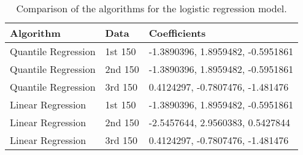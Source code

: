 \documentclass[article]{jss}\usepackage[]{graphicx}\usepackage[]{xcolor}
\begin{document}
\begin{table}[t!]
\centering
\begin{tabular}{llp{10cm}}
\hline
Algorithm           & Data    & Coefficients \\ \hline
Quantile Regression & 1st 150 & -1.3890396, 1.8959482, -0.5951861 \\
Quantile Regression & 2nd 150 & -1.3890396, 1.8959482, -0.5951861 \\
Quantile Regression & 3rd 150 & 0.4124297, -0.7807476, -1.481476 \\
Linear Regression   & 1st 150 & -1.3890396, 1.8959482, -0.5951861 \\ \hline
Linear Regression   & 2nd 150 & -2.5457644, 2.9560383, 0.5427844 \\ \hline
Linear Regression   & 3rd 150 & 0.4124297, -0.7807476, -1.481476 \\ \hline
\end{tabular}
\caption{\label{tab:logistic regression comparison} Comparison of the
algorithms for the logistic regression model.}
\end{table}
\end{document}

